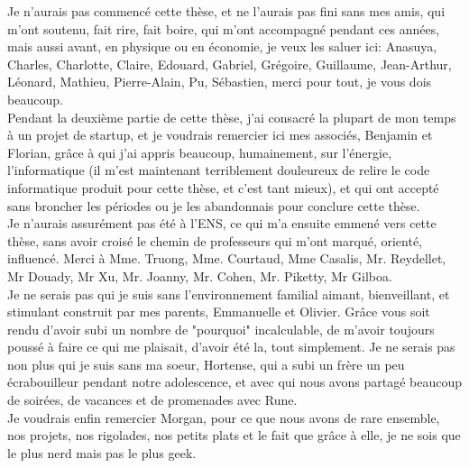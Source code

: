 Je n'aurais pas commencé cette thèse, et ne l'aurais pas fini sans mes amis, qui m'ont soutenu, fait rire, fait boire, qui m'ont accompagné pendant ces années, mais aussi avant, en physique ou en économie, je veux les saluer ici: Anasuya, Charles, Charlotte, Claire, Edouard, Gabriel, Grégoire, Guillaume, Jean-Arthur, Léonard, Mathieu, Pierre-Alain, Pu, Sébastien, merci pour tout, je vous dois beaucoup. \\

Pendant la deuxième partie de cette thèse, j'ai consacré la plupart de mon temps à un projet de startup, et je voudrais remercier ici mes associés, Benjamin et Florian, grâce à qui j'ai appris beaucoup, humainement, sur l'énergie, l'informatique (il m'est maintenant terriblement douleureux de relire le code informatique produit pour cette thèse, et c'est tant mieux), et qui ont accepté sans broncher les périodes ou je les abandonnais pour conclure cette thèse.\\

Je n'aurais assurément pas été à l'ENS, ce qui m'a ensuite emmené vers cette thèse, sans avoir croisé le chemin de professeurs qui m'ont marqué, orienté, influencé. Merci à Mme. Truong, Mme. Courtaud, Mme Casalis, Mr. Reydellet, Mr Douady, Mr Xu, Mr. Joanny, Mr. Cohen, Mr. Piketty, Mr Gilboa.\\

Je ne serais pas qui je suis sans l'environnement familial aimant, bienveillant, et stimulant construit par mes parents, Emmanuelle et Olivier. Grâce vous soit rendu d'avoir subi un nombre de "pourquoi" incalculable, de m'avoir toujours poussé à faire ce qui me plaisait, d'avoir été la, tout simplement. Je ne serais pas non plus qui je suis sans ma soeur, Hortense, qui a subi un frère un peu écrabouilleur pendant notre adolescence, et avec qui nous avons partagé beaucoup de soirées, de vacances et de promenades avec Rune. \\

Je voudrais enfin remercier Morgan, pour ce que nous avons de rare ensemble, nos projets, nos rigolades, nos petits plats et le fait que grâce à elle, je ne sois que le plus nerd mais pas le plus geek. \\
